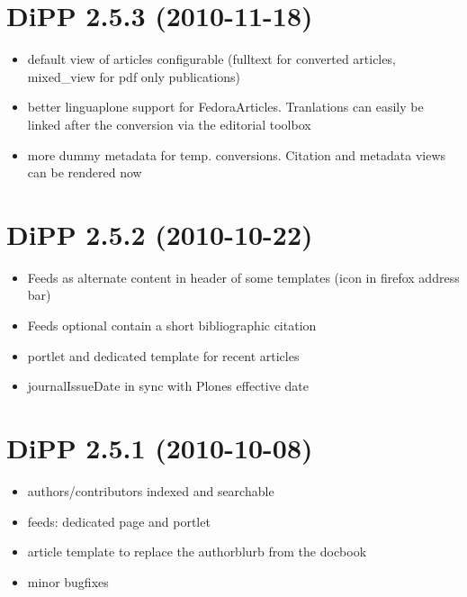 \documentclass[a4paper,10pt,ngerman]{sphinxmanual}
\begin{document}
\section{DiPP 2.5.3 (2010-11-18)}
\label{changelog:dipp-2-5-3-2010-11-18}\begin{itemize}
\item {} 
default view of articles configurable (fulltext for converted articles,
mixed\_view for pdf only publications)

\item {} 
better linguaplone support for FedoraArticles. Tranlations can easily
be linked after the conversion via the editorial toolbox

\item {} 
more dummy metadata for temp. conversions. Citation and metadata views
can be rendered now

\end{itemize}


\section{DiPP 2.5.2 (2010-10-22)}
\label{changelog:dipp-2-5-2-2010-10-22}\begin{itemize}
\item {} 
Feeds as alternate content in header of some templates (icon in
firefox address bar)

\item {} 
Feeds optional contain a short bibliographic citation

\item {} 
portlet and dedicated template for recent articles

\item {} 
journalIssueDate in sync with Plones effective date

\end{itemize}


\section{DiPP 2.5.1 (2010-10-08)}
\label{changelog:dipp-2-5-1-2010-10-08}\begin{itemize}
\item {} 
authors/contributors indexed and searchable

\item {} 
feeds: dedicated page and portlet

\item {} 
article template to replace the authorblurb from the docbook

\item {} 
minor bugfixes

\end{itemize}
\end{document}
